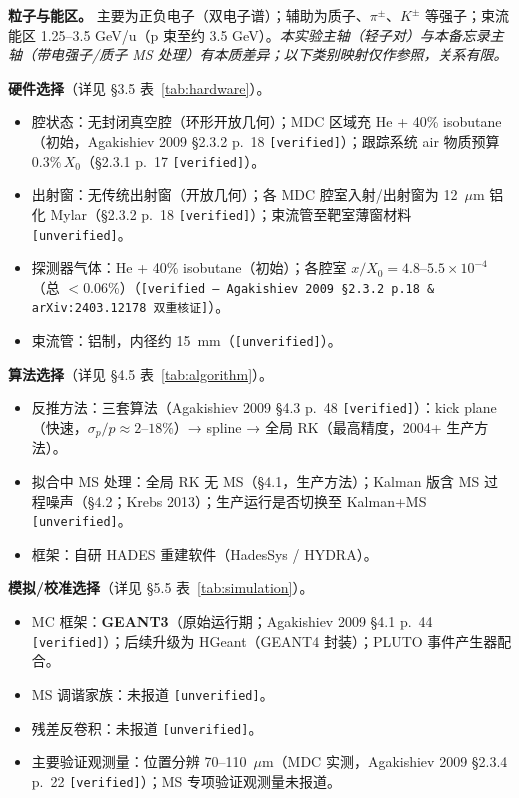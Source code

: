 \documentclass[a4paper, 11pt]{article}
\begin{document}
\textbf{粒子与能区。}
主要为正负电子（双电子谱）；辅助为质子、$\pi^{\pm}$、$K^{\pm}$ 等强子；束流能区 1.25--3.5 GeV/u（p 束至约 3.5 GeV）。\textit{本实验主轴（轻子对）与本备忘录主轴（带电强子/质子 MS 处理）有本质差异；以下类别映射仅作参照，关系有限。}

\textbf{硬件选择}（详见 §3.5 表~\ref{tab:hardware}）。
\begin{itemize}[leftmargin=2em,itemsep=0pt]
\item 腔状态：无封闭真空腔（环形开放几何）；MDC 区域充 He + 40\% isobutane（初始，Agakishiev 2009 §2.3.2 p.~18 \texttt{[verified]}）；跟踪系统 air 物质预算 $0.3\%\,X_0$（§2.3.1 p.~17 \texttt{[verified]}）。
\item 出射窗：无传统出射窗（开放几何）；各 MDC 腔室入射/出射窗为 12~$\mu$m 铝化 Mylar（§2.3.2 p.~18 \texttt{[verified]}）；束流管至靶室薄窗材料 \texttt{[unverified]}。
\item 探测器气体：He + 40\% isobutane（初始）；各腔室 $x/X_0 = 4.8$--$5.5 \times 10^{-4}$（总 $< 0.06$\%）（\texttt{[verified --- Agakishiev 2009 §2.3.2 p.18 \& arXiv:2403.12178 双重核证]}）。
\item 束流管：铝制，内径约 15~mm（\texttt{[unverified]}）。
\end{itemize}

\textbf{算法选择}（详见 §4.5 表~\ref{tab:algorithm}）。
\begin{itemize}[leftmargin=2em,itemsep=0pt]
\item 反推方法：三套算法（Agakishiev 2009 §4.3 p.~48 \texttt{[verified]}）：kick plane（快速，$\sigma_p/p \approx 2$--$18\%$）→ spline → 全局 RK（最高精度，2004+ 生产方法）。
\item 拟合中 MS 处理：全局 RK 无 MS（§4.1，生产方法）；Kalman 版含 MS 过程噪声（§4.2；Krebs 2013）；生产运行是否切换至 Kalman+MS \texttt{[unverified]}。
\item 框架：自研 HADES 重建软件（HadesSys / HYDRA）。
\end{itemize}

\textbf{模拟/校准选择}（详见 §5.5 表~\ref{tab:simulation}）。
\begin{itemize}[leftmargin=2em,itemsep=0pt]
\item MC 框架：\textbf{GEANT3}（原始运行期；Agakishiev 2009 §4.1 p.~44 \texttt{[verified]}）；后续升级为 HGeant（GEANT4 封装）；PLUTO 事件产生器配合。
\item MS 调谐家族：未报道 \texttt{[unverified]}。
\item 残差反卷积：未报道 \texttt{[unverified]}。
\item 主要验证观测量：位置分辨 70--110~$\mu$m（MDC 实测，Agakishiev 2009 §2.3.4 p.~22 \texttt{[verified]}）；MS 专项验证观测量未报道。
\end{itemize}
\end{document}
